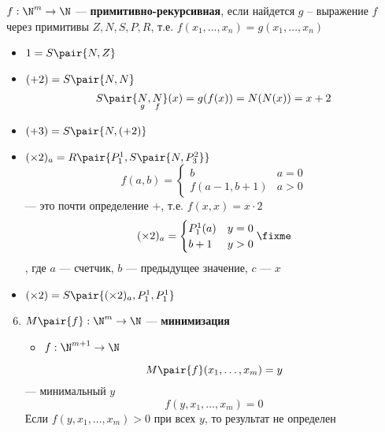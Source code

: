 \documentclass[english]{article}
\begin{document}
\begin{definition}
	\(f: \N^m \to \N\) --- \textbf{примитивно-рекурсивная}, если найдется \(g\) -- выражение \(f\) через примитивы \(Z, N, S, P, R\), т.е. \(f(x_1, \dots, x_n) = g(x_1, \dots, x_n)\)
	\label{org35d6b3d}
\end{definition}
\begin{examp}
	\-
	\begin{itemize}
		\item \(1 = S\pair{N, Z}\)
		\item \((+2) = S\pair{N, N}\)
		      \[ S\pair{\underset{g}{N}, \underset{f}{N}}(x) = g(f(x)) = N(N(x)) = x + 2 \]
		\item \((+3) = S\pair{N, (+2)}\)
		\item \((\times 2)_a = R\pair{P^1_1, S\pair{N, P^2_3}}\)
		      \[ f(a, b) = \begin{cases}
				      b               & a = 0 \\
				      f(a - 1, b + 1) & a > 0
			      \end{cases} \]
		      --- это почти определение \(+\), т.е. \(f(x, x) = x\cdot 2\)
		      \[ (\times 2)_a = \begin{cases}
				      P^1_1(a) & y = 0 \\
				      b + 1    & y > 0
			      \end{cases} \fixme \]
		      , где \(a\) --- счетчик, \(b\) --- предыдущее значение, \(c\) --- \(x\)
		\item \((\times 2) = S \pair{(\times 2)_a, P^1_1, P^1_1}\)
	\end{itemize}
\end{examp}
\begin{definition}
	\-
	\begin{enumerate}
		\setcounter{enumi}{5}
		\item \(M\pair{f}: \N^m \to \N\) --- \textbf{минимизация}
		      \begin{itemize}
			      \item \(f: \N^{m + 1} \to \N\)
		      \end{itemize}
		      \[ M\pair{f}(x_1, \dots, x_m) = y \]
		      --- минимальный \(y\)
		      \[ f(y, x_1, \dots, x_m) = 0 \]
		      Если \(f(y, x_1, \dots, x_m) > 0\) при всех \(y\), то результат не определен
	\end{enumerate}
	\label{org2ddd353}
\end{definition}
\end{document}
